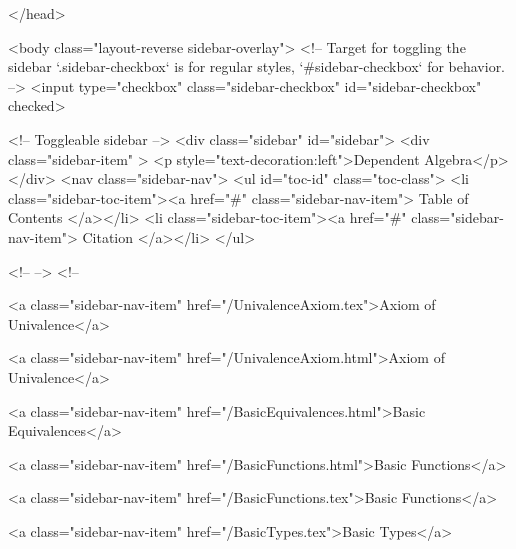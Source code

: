   
</head>




  <body class="layout-reverse sidebar-overlay">
    <!-- Target for toggling the sidebar `.sidebar-checkbox` is for regular
     styles, `#sidebar-checkbox` for behavior. -->
<input type="checkbox" class="sidebar-checkbox" id="sidebar-checkbox" checked>

<!-- Toggleable sidebar -->
<div class="sidebar" id="sidebar">
  <div class="sidebar-item" >
    <p style="text-decoration:left">Dependent Algebra</p>
  </div>
  <nav class="sidebar-nav">
    <ul id="toc-id" class="toc-class">
  <li class="sidebar-toc-item"><a href="#" class="sidebar-nav-item"> Table of Contents </a></li>
  <li class="sidebar-toc-item"><a href="#" class="sidebar-nav-item"> Citation </a></li>
</ul>


    <!--  -->
    <!-- 
      
    
      
    
      
    
      
    
      
        
      
    
      
        
          <a class="sidebar-nav-item" href="/UnivalenceAxiom.tex">Axiom of Univalence</a>
        
      
    
      
        
          <a class="sidebar-nav-item" href="/UnivalenceAxiom.html">Axiom of Univalence</a>
        
      
    
      
        
          <a class="sidebar-nav-item" href="/BasicEquivalences.html">Basic Equivalences</a>
        
      
    
      
        
          <a class="sidebar-nav-item" href="/BasicFunctions.html">Basic Functions</a>
        
      
    
      
        
          <a class="sidebar-nav-item" href="/BasicFunctions.tex">Basic Functions</a>
        
      
    
      
        
          <a class="sidebar-nav-item" href="/BasicTypes.tex">Basic Types</a>
        
